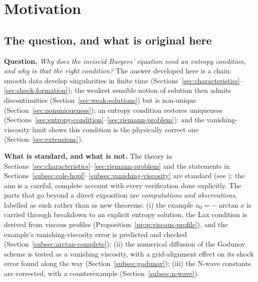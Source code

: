 
\section{Motivation}
\label{sec:motivation}

\subsection{The question, and what is original here}
\label{subsec:question}

\noindent\textbf{Question.} \emph{Why does the inviscid Burgers' equation
need an entropy condition, and why is that the right condition?} The
answer developed here is a chain: smooth data develop singularities in
finite time (Sections~\ref{sec:characteristics}--\ref{sec:shock-formation});
the weakest sensible notion of solution then admits discontinuities
(Section~\ref{sec:weak-solutions}) but is non-unique
(Section~\ref{sec:nonuniqueness}); an entropy condition restores uniqueness
(Sections~\ref{sec:entropy-condition}--\ref{sec:riemann-problem}); and the
vanishing-viscosity limit shows this condition is the physically correct one
(Section~\ref{sec:extensions}).

\noindent\textbf{What is standard, and what is not.} The theory in
Sections~\ref{sec:characteristics}--\ref{sec:riemann-problem} and the
statements in Sections~\ref{subsec:cole-hopf}--\ref{subsec:vanishing-viscosity}
are standard (see \cite[\S3.4]{evans2010}); the aim is a careful, complete
account with every verification done explicitly. The parts that go beyond
a direct exposition are \emph{computations and observations}, labelled as
such rather than as new theorems: (i) the example $u_0=-\arctan x$ is
carried through breakdown to an explicit entropy solution, the Lax condition
is derived from viscous profiles (Proposition~\ref{prop:viscous-profile}), and
the example's vanishing-viscosity error is predicted and checked
(Section~\ref{subsec:arctan-complete}); (ii) the numerical diffusion of the
Godunov scheme is tested as a vanishing viscosity, with a grid-alignment
effect on its shock error found along the way (Section~\ref{subsec:godunov});
(iii) the N-wave constants are corrected, with a counterexample
(Section~\ref{subsec:n-wave}).

